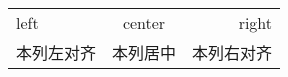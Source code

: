 \documentclass[nofonts]{ctexart}
\begin{document}
\begin{tabular}{lcr}
	left		& center	& right			\\
	本列左对齐	& 本列居中	& 本列右对齐	\\
\end{tabular}
\end{document}
